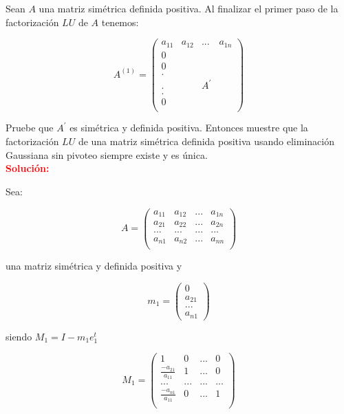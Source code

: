 Sean $A$ una matriz simétrica definida positiva. Al finalizar el primer paso de la factorización $LU$ de $A$ tenemos:

$$
A^{(1)} = \begin{pmatrix}
            a_{11} & a_{12} & ... & a_{1n} \\ 
            0 & & & \\
            0 & & & \\
            . & & & \\
            . & & A^{'} & \\
            . & & & \\
            0 & & & \\
        \end{pmatrix}
$$

Pruebe que $A^{'}$ es simétrica y definida positiva. Entonces muestre que la factorización $LU$ de una matriz simétrica definida positiva usando eliminación Gaussiana sin pivoteo siempre existe y es única.\\

\noindent \textcolor{red}{\bf Solución:\\}

Sea:

$$
A = \begin{pmatrix}
    a_{11} & a_{12} & ... & a_{1n} \\
    a_{21} & a_{22} & ... & a_{2n} \\
    ... & ... & ... & ... \\
    a_{n1} & a_{n2} & ... & a_{nn} \\
\end{pmatrix}
$$

una matriz simétrica y definida positiva y 

$$
m_1 = \begin{pmatrix}
    0 \\
    a_{21} \\
    ... \\
    a_{n1}
\end{pmatrix}
$$

siendo $M_1=I-m_1e_1^{t}$

$$
M_1 = \begin{pmatrix}
    1 & 0 & ... & 0 \\
    \frac{-a_{21}}{a_{11}} & 1 & ... & 0 \\
    ... & ... & ... & ... \\
    \frac{-a_{n1}}{a_{11}} & 0 & ... & 1 \\
\end{pmatrix}
$$

